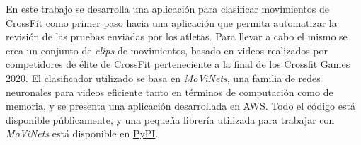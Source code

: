 En este trabajo se desarrolla una aplicación para clasificar movimientos de CrossFit como primer paso hacia una aplicación que permita automatizar la revisión de las pruebas enviadas por los atletas. Para llevar a cabo el mismo se crea un conjunto de \textit{clips} de movimientos, basado en videos realizados por competidores de élite de CrossFit perteneciente a la final de los Crossfit Games 2020. El clasificador utilizado se basa en \textit{MoViNets}, una familia de redes neuronales para videos eficiente tanto en términos de computación como de memoria, y se presenta una aplicación desarrollada en AWS. Todo el código está disponible públicamente, y una pequeña librería utilizada para trabajar con \textit{MoViNets} está disponible en \href{https://pypi.org/project/movinets_helper/}{PyPI}.




